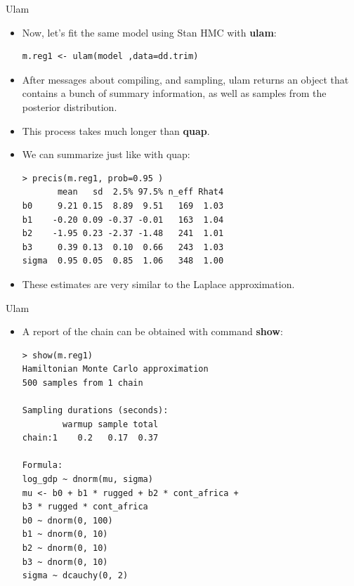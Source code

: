 \documentclass[handout]{beamer}
\begin{document}
\begin{frame}[fragile]{Ulam}
\scriptsize{

\begin{itemize}
\item Now, let's fit the same model using Stan HMC with \textbf{ulam}:

\begin{verbatim}
m.reg1 <- ulam(model ,data=dd.trim) 
\end{verbatim}



\item After messages about compiling, and sampling, ulam returns an object that contains a
bunch of summary information, as well as samples from the posterior distribution.

\item This process takes much longer than \textbf{quap}.

\item We can summarize just like with quap:

\begin{verbatim}
> precis(m.reg1, prob=0.95 )
       mean   sd  2.5% 97.5% n_eff Rhat4
b0     9.21 0.15  8.89  9.51   169  1.03
b1    -0.20 0.09 -0.37 -0.01   163  1.04
b2    -1.95 0.23 -2.37 -1.48   241  1.01
b3     0.39 0.13  0.10  0.66   243  1.03
sigma  0.95 0.05  0.85  1.06   348  1.00
\end{verbatim}

\item These estimates are very similar to the Laplace approximation.


\end{itemize}




} 
\end{frame}




\begin{frame}[fragile]{Ulam}
\scriptsize{

\begin{itemize}

\item A report of the chain can be obtained with command \textbf{show}:
\begin{verbatim}
> show(m.reg1)
Hamiltonian Monte Carlo approximation
500 samples from 1 chain

Sampling durations (seconds):
        warmup sample total
chain:1    0.2   0.17  0.37

Formula:
log_gdp ~ dnorm(mu, sigma)
mu <- b0 + b1 * rugged + b2 * cont_africa +
b3 * rugged * cont_africa
b0 ~ dnorm(0, 100)
b1 ~ dnorm(0, 10)
b2 ~ dnorm(0, 10)
b3 ~ dnorm(0, 10)
sigma ~ dcauchy(0, 2) 
\end{verbatim}



 \end{itemize}







} 
\end{frame}
\end{document}

